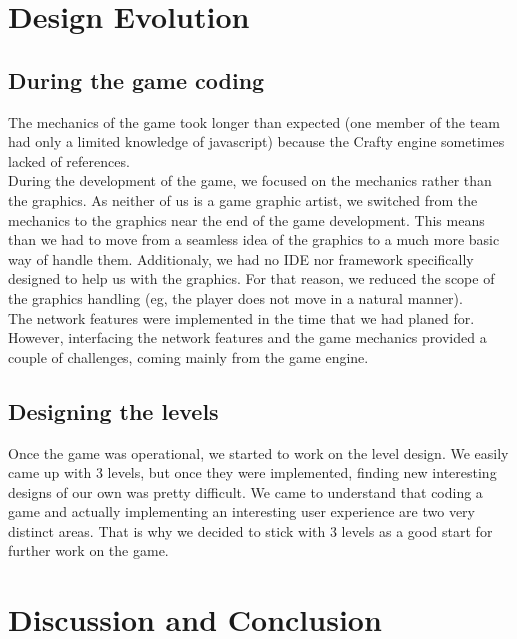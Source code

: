 \documentclass{chi-ext}
\begin{document}
\section{Design Evolution}
\subsection{During the game coding}
The mechanics of the game took longer than expected (one member of the team had only a limited knowledge of javascript) because the Crafty engine sometimes lacked of references.\\
During the development of the game, we focused on the mechanics rather than the graphics. As neither of us is a game graphic artist, we switched from the mechanics to the graphics near the end of the game development. This means than we had to move from a seamless idea of the graphics to a much more basic way of handle them. Additionaly, we had no IDE nor framework specifically designed to help us with the graphics. For that reason, we reduced the scope of the graphics handling (eg, the player does not move in a natural manner).\\
The network features were implemented in the time that we had planed for. However, interfacing the network features and the game mechanics provided a couple of challenges, coming mainly from the game engine.

\subsection{Designing the levels}
Once the game was operational, we started to work on the level design. We easily came up with 3 levels, but once they were implemented, finding new interesting designs of our own was pretty difficult. We came to understand that coding a game and actually implementing an interesting user experience are two very distinct areas. That is why we decided to stick with 3 levels as a good start for further work on the game.

\section{Discussion and Conclusion}

\balance


\end{document}
